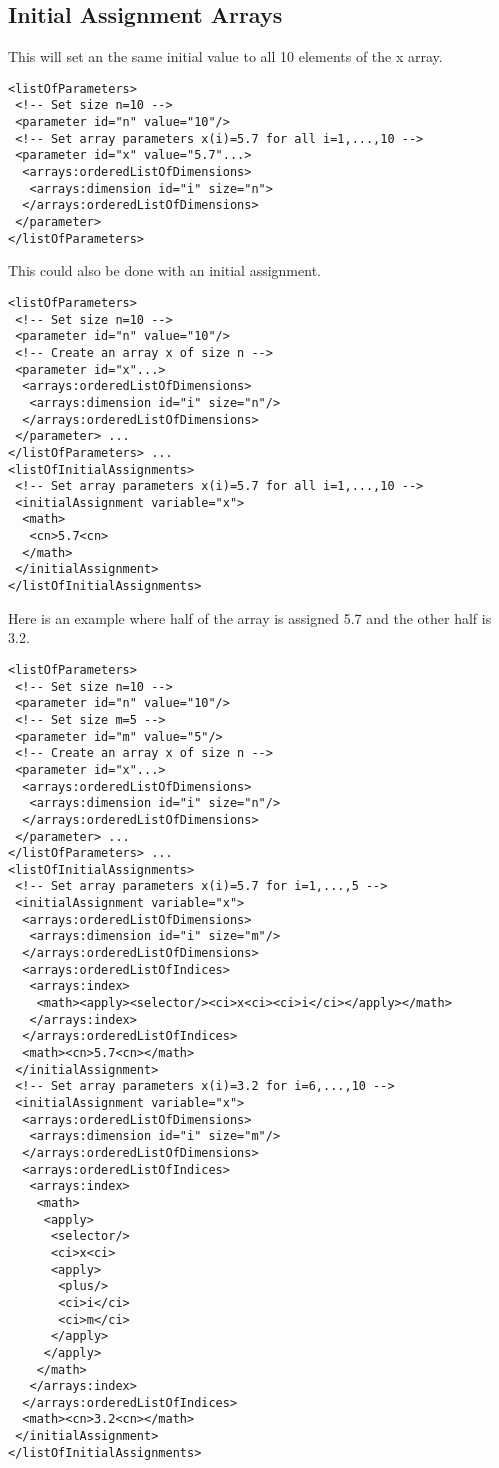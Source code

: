 \subsection{Initial Assignment Arrays}

This will set an the same initial value to all 10 elements of the x array.

\begin{verbatim}
<listOfParameters>
 <!-- Set size n=10 -->
 <parameter id="n" value="10"/>
 <!-- Set array parameters x(i)=5.7 for all i=1,...,10 -->
 <parameter id="x" value="5.7"...>
  <arrays:orderedListOfDimensions>
   <arrays:dimension id="i" size="n">
  </arrays:orderedListOfDimensions> 
 </parameter>
</listOfParameters>
\end{verbatim}

This could also be done with an initial assignment.

\begin{verbatim}
<listOfParameters> 
 <!-- Set size n=10 -->
 <parameter id="n" value="10"/>
 <!-- Create an array x of size n -->
 <parameter id="x"...>
  <arrays:orderedListOfDimensions>
   <arrays:dimension id="i" size="n"/> 
  </arrays:orderedListOfDimensions>
 </parameter> ...
</listOfParameters> ...
<listOfInitialAssignments>
 <!-- Set array parameters x(i)=5.7 for all i=1,...,10 -->
 <initialAssignment variable="x">
  <math>
   <cn>5.7<cn>
  </math>
 </initialAssignment>
</listOfInitialAssignments>
\end{verbatim}

Here is an example where half of the array is assigned 5.7 and the other half is 3.2. 

\begin{verbatim}
<listOfParameters> 
 <!-- Set size n=10 -->
 <parameter id="n" value="10"/>
 <!-- Set size m=5 -->
 <parameter id="m" value="5"/>
 <!-- Create an array x of size n -->
 <parameter id="x"...>
  <arrays:orderedListOfDimensions>
   <arrays:dimension id="i" size="n"/> 
  </arrays:orderedListOfDimensions>
 </parameter> ...
</listOfParameters> ...
<listOfInitialAssignments>
 <!-- Set array parameters x(i)=5.7 for i=1,...,5 -->
 <initialAssignment variable="x"> 
  <arrays:orderedListOfDimensions>
   <arrays:dimension id="i" size="m"/>
  </arrays:orderedListOfDimensions>
  <arrays:orderedListOfIndices>
   <arrays:index>
    <math><apply><selector/><ci>x<ci><ci>i</ci></apply></math>
   </arrays:index>
  </arrays:orderedListOfIndices>
  <math><cn>5.7<cn></math>
 </initialAssignment>
 <!-- Set array parameters x(i)=3.2 for i=6,...,10 -->
 <initialAssignment variable="x">
  <arrays:orderedListOfDimensions>
   <arrays:dimension id="i" size="m"/>
  </arrays:orderedListOfDimensions>
  <arrays:orderedListOfIndices>
   <arrays:index>
    <math>
     <apply>
      <selector/>
      <ci>x<ci>
      <apply>
       <plus/>
       <ci>i</ci>
       <ci>m</ci>
      </apply>
     </apply>
    </math>
   </arrays:index>
  </arrays:orderedListOfIndices>
  <math><cn>3.2<cn></math>
 </initialAssignment>
</listOfInitialAssignments>
\end{verbatim}

